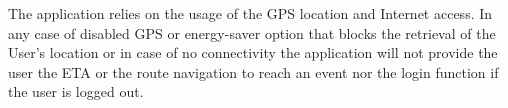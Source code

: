 The application relies on the usage of the GPS location and Internet access. In any case of disabled GPS or energy-saver option that blocks the retrieval of the User’s location or in case of no connectivity the application will not provide the user the ETA or the route navigation to reach an event nor the login function if the user is logged out.